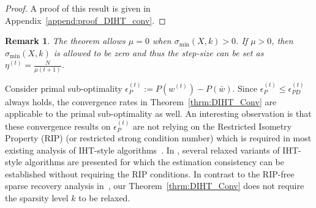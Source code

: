 \documentclass[11pt]{article}
\newtheorem{remark}{Remark}
\newcommand{\supp}{\text{supp}}
\numberwithin{equation}{section}
\numberwithin{table}{section}
\numberwithin{figure}{section}
\begin{document}
\begin{proof}
A proof of this result is given in Appendix~\ref{append:proof_DIHT_conv}.
\end{proof}
\begin{remark}
The theorem allows $\mu = 0$ when $\sigma_{\min}(X,k)>0$. If $\mu >0$, then $\sigma_{\min}(X,k)$ is allowed to be zero and thus the step-size can be set as $\eta^{(t)}=\frac{N}{\mu(t+1)}$.
\end{remark}
Consider primal sub-optimality $\epsilon_P^{(t)}:=P(w^{(t)}) - P(\bar w)$. Since $\epsilon_P^{(t)} \le \epsilon_{PD}^{(t)}$ always holds, the convergence rates in Theorem~\ref{thrm:DIHT_Conv} are applicable to the primal sub-optimality as well. An interesting observation is that these convergence results on $\epsilon_P^{(t)}$ are not relying on the Restricted Isometry Property (RIP) (or restricted strong condition number) which is required in most existing analysis of IHT-style algorithms~\citep{blumensath2009iterative,Yuan-ICML-2014}. In \citep{jain2014iterative}, several relaxed variants of IHT-style algorithms are presented for which the estimation consistency can be established without requiring the RIP conditions. In contrast to the RIP-free sparse recovery analysis in~\citep{jain2014iterative}, our Theorem~\ref{thrm:DIHT_Conv} does not require the sparsity level $k$ to be relaxed.
\end{document}

